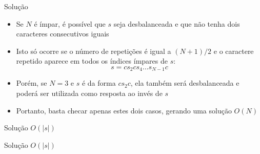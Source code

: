 \begin{frame}[fragile]{Solução}

    \begin{itemize}
        \item Se $N$ é ímpar, é possível que $s$ seja desbalanceada e que não tenha dois caracteres
            consecutivos iguais

        \item Isto só ocorre se o número de repetições é igual a $(N + 1)/2$ e o caractere repetido
            aparece em todos os índices ímpares de $s$:
        \[
            s = cs_2cs_4\ldots s_{N - 1}c
        \]

        \item Porém, se $N = 3$ e $s$ é da forma $cs_2c$, ela também será desbalanceada e poderá
            ser utilizada como resposta ao invés de $s$

        \item Portanto, basta checar apenas estes dois casos, gerando uma solução $O(N)$

    \end{itemize}

\end{frame}

\begin{frame}[fragile]{Solução $O(|s|)$}
\end{frame}

\begin{frame}[fragile]{Solução $O(|s|)$}
\end{frame}
